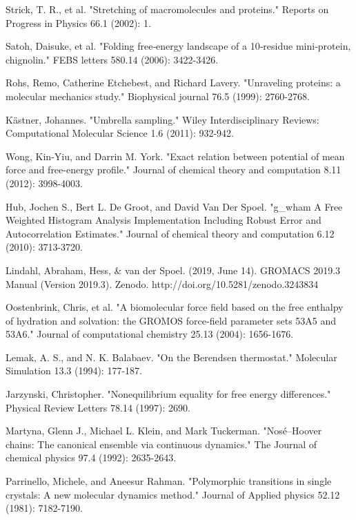 \documentclass[12pt, onecolumn]{revtex4}    %
\begin{document}
\begin{thebibliography}{}

 Strick, T. R., et al. "Stretching of macromolecules and proteins." Reports on Progress in Physics 66.1 (2002): 1.

Satoh, Daisuke, et al. "Folding free‐energy landscape of a 10‐residue mini‐protein, chignolin." FEBS letters 580.14 (2006): 3422-3426.

 Rohs, Remo, Catherine Etchebest, and Richard Lavery. "Unraveling proteins: a molecular mechanics study." Biophysical journal 76.5 (1999): 2760-2768.

 Kästner, Johannes. "Umbrella sampling." Wiley Interdisciplinary Reviews: Computational Molecular Science 1.6 (2011): 932-942.

 Wong, Kin-Yiu, and Darrin M. York. "Exact relation between potential of mean force and free-energy profile." Journal of chemical theory and computation 8.11 (2012): 3998-4003.

 Hub, Jochen S., Bert L. De Groot, and David Van Der Spoel. "g{\_}wham A Free Weighted Histogram Analysis Implementation Including Robust Error and Autocorrelation Estimates." Journal of chemical theory and computation 6.12 (2010): 3713-3720.

 Lindahl, Abraham, Hess, \& van der Spoel. (2019, June 14). GROMACS 2019.3 Manual (Version 2019.3). Zenodo. http://doi.org/10.5281/zenodo.3243834

 Oostenbrink, Chris, et al. "A biomolecular force field based on the free enthalpy of hydration and solvation: the GROMOS force‐field parameter sets 53A5 and 53A6." Journal of computational chemistry 25.13 (2004): 1656-1676.

 Lemak, A. S., and N. K. Balabaev. "On the Berendsen thermostat." Molecular Simulation 13.3 (1994): 177-187.

 Jarzynski, Christopher. "Nonequilibrium equality for free energy differences." Physical Review Letters 78.14 (1997): 2690.

Martyna, Glenn J., Michael L. Klein, and Mark Tuckerman. "Nosé–Hoover chains: The canonical ensemble via continuous dynamics." The Journal of chemical physics 97.4 (1992): 2635-2643.

 Parrinello, Michele, and Aneesur Rahman. "Polymorphic transitions in single crystals: A new molecular dynamics method." Journal of Applied physics 52.12 (1981): 7182-7190.


\end{thebibliography}
\end{document}

